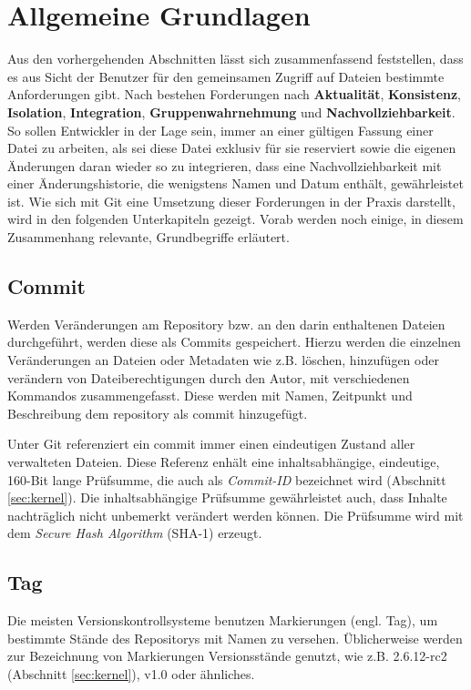\section{Allgemeine Grundlagen}\label{sec:Grundlagen}
Aus den vorhergehenden Abschnitten lässt sich zusammenfassend feststellen, dass
es aus Sicht der Benutzer für den gemeinsamen Zugriff auf Dateien bestimmte
Anforderungen gibt. Nach \cite[S.~37]{hagen:1678} bestehen Forderungen nach
\textbf{Aktualität}, \textbf{Konsistenz}, \textbf{Isolation},
\textbf{Integration}, \textbf{Gruppenwahrnehmung} und
\textbf{Nachvollziehbarkeit}. So sollen Entwickler in der Lage sein, immer an
einer gültigen Fassung einer Datei zu arbeiten, als sei diese Datei exklusiv für
sie reserviert sowie die eigenen Änderungen daran wieder so zu integrieren, dass
eine Nachvollziehbarkeit mit einer Änderungshistorie, die wenigstens Namen und
Datum enthält, gewährleistet ist. Wie sich mit Git eine Umsetzung dieser
Forderungen in der Praxis darstellt, wird in den folgenden Unterkapiteln
gezeigt. Vorab werden noch einige, in diesem Zusammenhang relevante,
Grundbegriffe erläutert.

\subsection{Commit}\label{sec:commit}
Werden Veränderungen am Repository bzw. an den darin enthaltenen
Dateien durchgeführt, werden diese als Commits gespeichert. Hierzu werden die einzelnen
Veränderungen an Dateien oder Metadaten wie z.B. löschen, hinzufügen oder verändern
von Dateiberechtigungen durch den Autor, mit verschiedenen Kommandos
zusammengefasst. Diese werden mit Namen, Zeitpunkt und Beschreibung dem
\gls{repository} als \gls{commit} hinzugefügt. \cite[S.~20]{gitosp}

Unter Git referenziert ein \gls{commit} immer einen eindeutigen Zustand aller
verwalteten Dateien. Diese Referenz enhält eine inhaltsabhängige, eindeutige,
160-Bit lange Prüfsumme, die auch als \textit{Commit-ID} bezeichnet
wird (Abschnitt \ref{sec:kernel}). Die inhaltsabhängige Prüfsumme gewährleistet
auch, dass Inhalte nachträglich nicht unbemerkt verändert werden können. Die
Prüfsumme wird mit dem \textit{Secure Hash Algorithm} (\gls{SHA-1})
erzeugt. \cite[S.~20-21]{gitosp}

\subsection{Tag}\label{sec:tag}
Die meisten Versionskontrollsysteme benutzen Markierungen (engl. Tag), um
bestimmte Stände des Repositorys mit Namen zu versehen. Üblicherweise werden
zur Bezeichnung von Markierungen Versionsstände genutzt, wie z.B.
2.6.12-rc2 (Abschnitt \ref{sec:kernel}), v1.0 oder ähnliches. \cite[S.~48]{progit}

